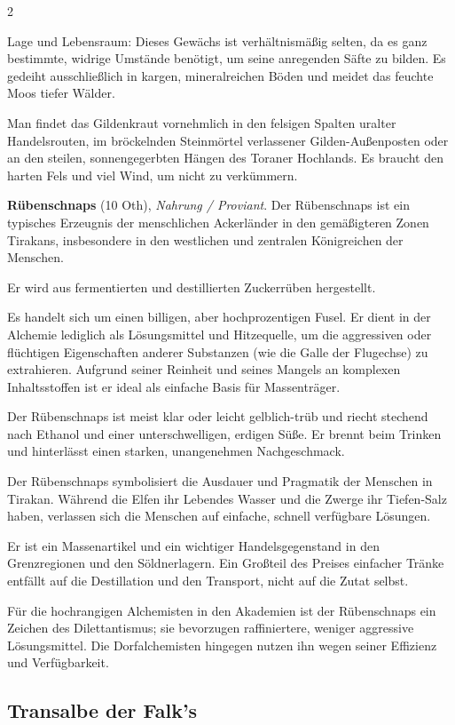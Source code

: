\begin{multicols}{2}
\begin{denseitemize}
Lage und Lebensraum:
Dieses Gewächs ist verhältnismäßig selten, da es ganz bestimmte, widrige Umstände benötigt, um seine anregenden Säfte zu bilden. Es gedeiht ausschließlich in kargen, mineralreichen Böden und meidet das feuchte Moos tiefer Wälder.

Man findet das Gildenkraut vornehmlich in den felsigen Spalten uralter Handelsrouten, im bröckelnden Steinmörtel verlassener Gilden-Außenposten oder an den steilen, sonnengegerbten Hängen des Toraner Hochlands. Es braucht den harten Fels und viel Wind, um nicht zu verkümmern.
        \item \textbf{Rübenschnaps} (10 Oth), \textit{Nahrung / Proviant}.
        Der Rübenschnaps ist ein typisches Erzeugnis der menschlichen Ackerländer in den gemäßigteren Zonen Tirakans, insbesondere in den westlichen und zentralen Königreichen der Menschen.

Er wird aus fermentierten und destillierten Zuckerrüben hergestellt.

Es handelt sich um einen billigen, aber hochprozentigen Fusel. Er dient in der Alchemie lediglich als Lösungsmittel und Hitzequelle, um die aggressiven oder flüchtigen Eigenschaften anderer Substanzen (wie die Galle der Flugechse) zu extrahieren. Aufgrund seiner Reinheit und seines Mangels an komplexen Inhaltsstoffen ist er ideal als einfache Basis für Massenträger.

Der Rübenschnaps ist meist klar oder leicht gelblich-trüb und riecht stechend nach Ethanol und einer unterschwelligen, erdigen Süße. Er brennt beim Trinken und hinterlässt einen starken, unangenehmen Nachgeschmack.

Der Rübenschnaps symbolisiert die Ausdauer und Pragmatik der Menschen in Tirakan. Während die Elfen ihr Lebendes Wasser und die Zwerge ihr Tiefen-Salz haben, verlassen sich die Menschen auf einfache, schnell verfügbare Lösungen.

Er ist ein Massenartikel und ein wichtiger Handelsgegenstand in den Grenzregionen und den Söldnerlagern. Ein Großteil des Preises einfacher Tränke entfällt auf die Destillation und den Transport, nicht auf die Zutat selbst.

Für die hochrangigen Alchemisten in den Akademien ist der Rübenschnaps ein Zeichen des Dilettantismus; sie bevorzugen raffiniertere, weniger aggressive Lösungsmittel. Die Dorfalchemisten hingegen nutzen ihn wegen seiner Effizienz und Verfügbarkeit.
    \end{denseitemize}


    \subsection*{Transalbe der Falk's}


\end{multicols}
